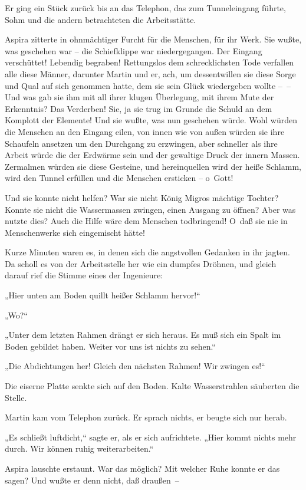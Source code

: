 Er ging ein Stück zurück bis an das Telephon, das zum Tunneleingang
führte, Sohm und die andern betrachteten die Arbeitsstätte.

Aspira zitterte in ohnmächtiger Furcht für die Menschen, für ihr
Werk. Sie wußte, was geschehen war – die Schiefklippe war
niedergegangen. Der Eingang verschüttet! Lebendig begraben!
Rettungslos dem schrecklichsten Tode verfallen alle diese Männer,
darunter Martin und er, ach, um dessentwillen sie diese Sorge und
Qual auf sich genommen hatte, dem sie sein Glück wiedergeben wollte
–~– Und was gab sie ihm mit all ihrer klugen Überlegung, mit ihrem
Mute der Erkenntnis? Das Verderben! Sie, ja sie trug im Grunde die
Schuld an dem Komplott der Elemente! Und sie wußte, was nun
geschehen würde. Wohl würden die Menschen an den Eingang eilen, von
innen wie von außen würden sie ihre Schaufeln ansetzen um den
Durchgang zu erzwingen, aber schneller als ihre Arbeit würde die
der Erdwärme sein und der gewaltige Druck der innern Massen.
Zermalmen würden sie diese Gesteine, und hereinquellen wird der
heiße Schlamm, wird den Tunnel erfüllen und die Menschen ersticken
– o~Gott!

Und sie konnte nicht helfen? War sie nicht König Migros mächtige
Tochter? Konnte sie nicht die Wassermassen zwingen, einen Ausgang
zu öffnen? Aber was nutzte dies? Auch die Hilfe wäre dem Menschen
todbringend! O~daß sie nie in Menschenwerke sich eingemischt
hätte!

Kurze Minuten waren es, in denen sich die angstvollen Gedanken in
ihr jagten. Da scholl es von der Arbeitsstelle her wie ein dumpfes
Dröhnen, und gleich darauf rief die Stimme eines der Ingenieure:

„Hier unten am Boden quillt heißer Schlamm hervor!“

„Wo?“

„Unter dem letzten Rahmen drängt er sich heraus. Es muß sich ein
Spalt im Boden gebildet haben. Weiter vor uns ist nichts zu
sehen.“

„Die Abdichtungen her! Gleich den nächsten Rahmen! Wir zwingen
es!“

Die eiserne Platte senkte sich auf den Boden. Kalte Wasserstrahlen
säuberten die Stelle.

Martin kam vom Telephon zurück. Er sprach nichts, er beugte sich
nur herab.

„Es schließt luftdicht,“ sagte er, als er sich aufrichtete. „Hier
kommt nichts mehr durch. Wir können ruhig weiterarbeiten.“

Aspira lauschte erstaunt. War das möglich? Mit welcher Ruhe konnte
er das sagen? Und wußte er denn nicht, daß draußen~–

